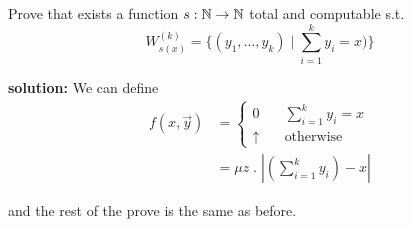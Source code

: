 \begin{exercise}
  Prove that exists a function $s: \mathbb{N} \rightarrow \mathbb{N}$ total and computable
  s.t.
  \[W_{s(x)}^{(k)} = \{(y_1, \dots, y_k) \; | \;
    \sum\limits_{i=1}^ky_i = x)\}\]

  \textbf{solution:} We can define
  \[
    \begin{aligned}
      f(x, \vec{y}) &=
      \begin{cases}
        0 & \quad \sum_{i=1}^ky_i = x \\
        \uparrow & \quad \mbox{otherwise}
      \end{cases} \\
      &= \mu z \; . \; |(\sum_{i=1}^ky_i) - x|
    \end{aligned}
  \]

  and the rest of the prove is the same as before.
\end{exercise}







